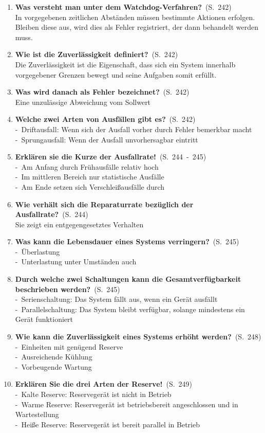 \documentclass[a4paper,12pt]{article}
\newcommand{\question}[3]{\pagebreak[3]\item {\textbf{#1?}}\ (S.\ #2)#3}
\newcommand{\statement}[3]{\pagebreak[3]\item {\textbf{#1!}}\ (S.\ #2)#3}
\newcommand{\catchword}[1]{\\-\ #1}
\newcommand{\normaltext}[1]{\\#1}
\newcommand{\page}[1]{#1}
\newcommand{\pages}[2]{#1\ -\ #2}
\begin{document}
\begin{enumerate}
  \question{Was versteht man unter dem Watchdog-Verfahren}{\page{242}}
  {
    \normaltext{In vorgegebenen zeitlichen Abständen müssen bestimmte Aktionen erfolgen.
                Bleiben diese aus, wird dies als Fehler registriert, der dann behandelt
                werden muss.}
  }

  \question{Wie ist die Zuverlässigkeit definiert}{\page{242}}
  {
    \normaltext{Die Zuverlässigkeit ist die Eigenschaft, dass sich ein System innerhalb
                vorgegebener Grenzen bewegt und seine Aufgaben somit erfüllt.}
  }

  \question{Was wird danach als Fehler bezeichnet}{\page{242}}
  {
    \normaltext{Eine unzulässige Abweichung vom Sollwert}
  }

  \question{Welche zwei Arten von Ausfällen gibt es}{\page{242}}
  {
    \catchword{Driftausfall: Wenn sich der Ausfall vorher durch Fehler bemerkbar macht}
    \catchword{Sprungausfall: Wenn der Ausfall unvorhersagbar eintritt}
  }

  \statement{Erklären sie die Kurze der Ausfallrate}{\pages{244}{245}}
  {
    \catchword{Am Anfang durch Frühausfälle relativ hoch}
    \catchword{Im mittleren Bereich nur statistische Ausfälle}
    \catchword{Am Ende setzen sich Verschleißausfälle durch}
  }

  \question{Wie verhält sich die Reparaturrate bezüglich der Ausfallrate}{\page{244}}
  {
    \normaltext{Sie zeigt ein entgegengesetztes Verhalten}
  }

  \question{Was kann die Lebensdauer eines Systems verringern}{\page{245}}
  {
    \catchword{Überlastung}
    \catchword{Unterlastung unter Umständen auch}
  }

  \question{Durch welche zwei Schaltungen kann die Gesamtverfügbarkeit beschrieben
            werden}{\page{245}}
  {
    \catchword{Serienschaltung: Das System fällt aus, wenn ein Gerät ausfällt}
    \catchword{Parallelschaltung: Das System bleibt verfügbar, solange mindestens ein
               Gerät funktioniert}
  }

  \question{Wie kann die Zuverlässigkeit eines Systems erhöht werden}{\page{248}}
  {
    \catchword{Einheiten mit genügend Reserve}
    \catchword{Ausreichende Kühlung}
    \catchword{Vorbeugende Wartung}
  }

  \statement{Erklären Sie die drei Arten der Reserve}{\page{249}}
  {
    \catchword{Kalte Reserve: Reservegerät ist nicht in Betrieb}
    \catchword{Warme Reserve: Reservegerät ist betriebsbereit angeschlossen und
               in Wartestellung}
    \catchword{Heiße Reserve: Reservegerät ist bereit parallel in Betrieb}
  }


\end{enumerate}
\end{document}
